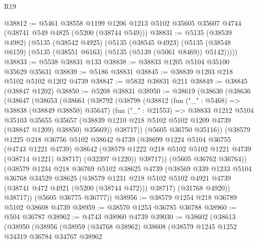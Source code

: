 \begin{lexlean}{R19}
\begin{coremodule}
{{{{{{{{{{{@38812 := @5461
    @38558
    @1199
    @1206
    @1213
    @5102
    @35605
    @35607
    @4744
    (@38741 @549 @4825 (@5200 (@38744 @549)))
@38831 := @5135
    (@38539 @4982)
    (@5135
      (@38542 @4925)
      (@5135
        (@38545 @4923)
        (@5135 (@38548 @6159) (@5135 (@38551 @6163) (@5135 (@5139 (@5061 @8469)) @5142)))))
@38833 := @5538 @38831 @133
@38838 := @38833 @1205 @5104 @35100 @35629 @35631
@38839 := @5186 @38831
@38845 := @38839 @1203 @218 @5102 @5102 @1202 @4739
@38847 := @5832 @38831 @211
@38849 := @38845 (@38847 @1202)
@38850 := @5208 @38831
@38950 := @38619
    (@38630
      (@38636
        (@38647
          (@38653
            (@38661
              (@38792
                (@38798
                  (@38812
                    (fun ("_" : @5468) => @38838 (@38849 @38850) @35647)
                    (fun ("_" : @21553) =>
                    @38833
                      @1212
                      @5104
                      @35103
                      @35655
                      @35657
                      (@38839 @1210 @218 @5102 @5102 @1209 @4739 (@38847 @1209) @38850)
                      @35669))
                  @38717))
              (@5605 @36750 @35116))
            (@38579
              @1225
              @218
              @36756
              @5102
              @38642
              @4739
              (@38699
                @1224
                @5104
                @36755
                (@4743 @1221 @4739)
                @38642
                (@38579 @1222 @218 @5102 @5102 @1221 @4739 (@38714 @1221) @38717)
                (@32397 @1220))
              @38717))
          (@5605 @36762 @36764))
        (@38579
          @1234
          @218
          @36769
          @5102
          @38625
          @4739
          (@38569
            @339
            @1233
            @5104
            @36768
            @34529
            @38625
            (@38579
              @1231
              @218
              @5102
              @5102
              @4921
              @4739
              (@38741 @472 @4921 (@5200 (@38744 @472)))
              @38717)
            (@31768 @4920))
          @38717))
      (@5605 @36775 @36777))
@38956 := @38579 @1254 @218 @36789 @5102 @38608 @4739
@38959 := @38570 @1253 @36785 @36788
@38960 := @504 @36787
@38962 := @4743 @38960 @4739
@39030 := @38602
    (@38613
      (@38950
        (@38956
          (@38959
            (@34768 @38962)
            @38608
            (@38579
              @1245
              @1252
              @34319
              @36784
              @34767
              @38962
}}}}}}}}}}}
\end{coremodule}
\end{lexlean}

